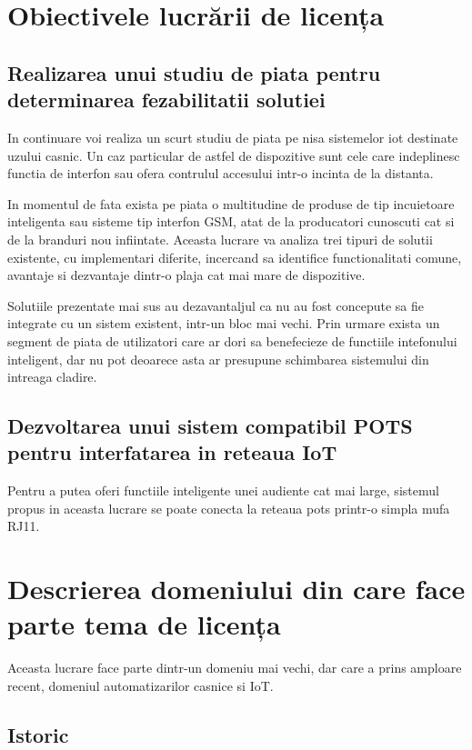 \section {Obiectivele lucrării de licența}

\subsection {Realizarea unui studiu de piata pentru determinarea fezabilitatii solutiei}

In continuare voi realiza un scurt studiu de piata pe nisa sistemelor \acrfull{iot} destinate uzului casnic. Un caz particular de astfel de dispozitive sunt cele care indeplinesc functia de interfon sau ofera contrulul accesului intr-o incinta de la distanta.

In momentul de fata exista pe piata o multitudine de produse de tip incuietoare inteligenta sau sisteme tip interfon GSM, atat de la producatori cunoscuti cat si de la branduri nou infiintate. Aceasta lucrare va analiza trei tipuri de solutii existente, cu implementari diferite, incercand sa identifice functionalitati comune, avantaje si dezvantaje dintr-o plaja cat mai mare de dispozitive.

Solutiile prezentate mai sus au dezavantaljul ca nu au fost concepute sa fie integrate cu un sistem existent, intr-un bloc mai vechi. Prin urmare exista un segment de piata de utilizatori care ar dori sa benefecieze de functiile intefonului inteligent, dar nu pot deoarece asta ar presupune schimbarea sistemului din intreaga cladire.


\subsection {Dezvoltarea unui sistem compatibil POTS pentru interfatarea in reteaua IoT}

Pentru a putea oferi functiile inteligente unei audiente cat mai large, sistemul propus in aceasta lucrare se poate conecta la reteaua \acrfull{pots} printr-o simpla mufa RJ11.


\section {Descrierea domeniului din care face parte tema de licența}

Aceasta lucrare face parte dintr-un domeniu mai vechi, dar care a prins amploare recent, domeniul automatizarilor casnice si IoT. 


\subsection {Istoric}

